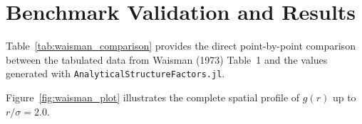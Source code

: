 \documentclass[11pt,a4paper]{article}
\begin{document}
\section{Benchmark Validation and Results}

Table~\ref{tab:waisman_comparison} provides the direct point-by-point comparison between the tabulated data from Waisman (1973) Table~1 and the values generated with \texttt{AnalyticalStructureFactors.jl}.

\begin{table}[htbp]
\centering
\caption{Comparison of radial distribution function $g(x)$ for hard spheres at packing fraction $\eta = 0.49$. Data columns: Computer Experiment [Barker \& Henderson, 1971], Percus--Yevick theoretical values, and Waisman MSA values.}
\label{tab:waisman_comparison}
\vspace{0.5em}
\end{table}

Figure~\ref{fig:waisman_plot} illustrates the complete spatial profile of $g(r)$ up to $r/\sigma = 2.0$.
\end{document}
